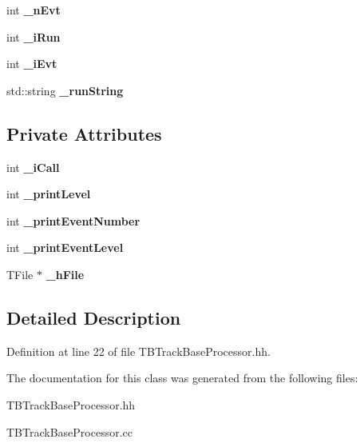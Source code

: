 \begin{DoxyCompactItemize}
\item 
int {\bfseries \_\-nEvt}\label{classTBTrackBaseProcessor_ac9ffd20b554281d63c4db5f8c16e3426}

\item 
int {\bfseries \_\-iRun}\label{classTBTrackBaseProcessor_ab91b172b59af005bce84b0b850fa29e6}

\item 
int {\bfseries \_\-iEvt}\label{classTBTrackBaseProcessor_a1aa277e041851d79b291447597f56fb2}

\item 
std::string {\bfseries \_\-runString}\label{classTBTrackBaseProcessor_a4b5f2e25f41f467972772f2e8cbe90c6}

\end{DoxyCompactItemize}
\subsection*{Private Attributes}
\begin{DoxyCompactItemize}
\item 
int {\bfseries \_\-iCall}\label{classTBTrackBaseProcessor_a6233e01b6d5f8b6ae13278e26fd2225a}

\item 
int {\bfseries \_\-printLevel}\label{classTBTrackBaseProcessor_a6992548df906f3e9fe087cda782279ac}

\item 
int {\bfseries \_\-printEventNumber}\label{classTBTrackBaseProcessor_a9a8f6e7a20da0a4bd9eebbf4989efe32}

\item 
int {\bfseries \_\-printEventLevel}\label{classTBTrackBaseProcessor_a6bedefbd3cbed3a851983319c9894ec6}

\item 
TFile $\ast$ {\bfseries \_\-hFile}\label{classTBTrackBaseProcessor_adcbd4089b530b5af6be4ea277f999e75}

\end{DoxyCompactItemize}


\subsection{Detailed Description}


Definition at line 22 of file TBTrackBaseProcessor.hh.

The documentation for this class was generated from the following files:\begin{DoxyCompactItemize}
\item 
TBTrackBaseProcessor.hh\item 
TBTrackBaseProcessor.cc\end{DoxyCompactItemize}
